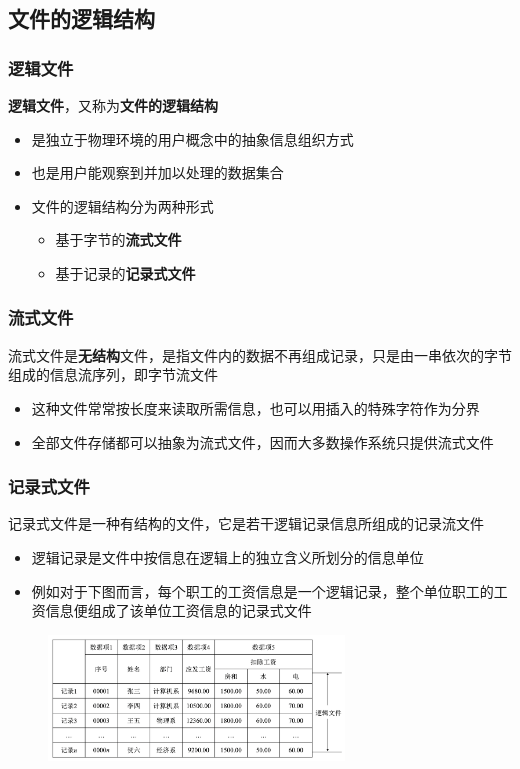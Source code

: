 \documentclass[cs4size,a4paper,10pt]{ctexart}
\begin{document}
	\subsection{文件的逻辑结构}

	\subsubsection{逻辑文件}
	\textbf{逻辑文件}，又称为\textbf{文件的逻辑结构}
	\begin{itemize}
		\item 是独立于物理环境的用户概念中的抽象信息组织方式
		\item 也是用户能观察到并加以处理的数据集合
		\item 文件的逻辑结构分为两种形式
		\begin{itemize}
			\item 基于字节的\textbf{流式文件}
			\item 基于记录的\textbf{记录式文件}
		\end{itemize}
	\end{itemize}

	\subsubsection{流式文件}
	流式文件是\textbf{无结构}文件，是指文件内的数据不再组成记录，只是由一串依次的字节组成的信息流序列，即字节流文件
	\begin{itemize}
		\item 这种文件常常按长度来读取所需信息，也可以用插入的特殊字符作为分界
		\item 全部文件存储都可以抽象为流式文件，因而大多数操作系统只提供流式文件
	\end{itemize}
	
	\subsubsection{记录式文件}
	记录式文件是一种有结构的文件，它是若干逻辑记录信息所组成的记录流文件
	\begin{itemize}
		\item 逻辑记录是文件中按信息在逻辑上的独立含义所划分的信息单位
		\item 例如对于下图而言，每个职工的工资信息是一个逻辑记录，整个单位职工的工资信息便组成了该单位工资信息的记录式文件
	\end{itemize}
	\begin{figure}[H]
		\centering
		\includegraphics[width=0.7\textwidth]{img/5.2.2.3}
	\end{figure}
\end{document}
